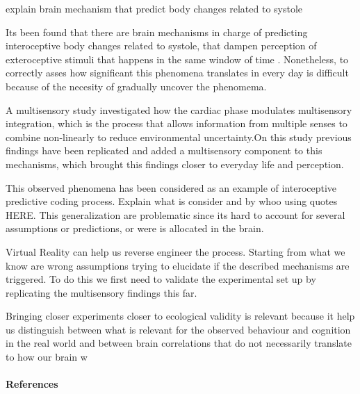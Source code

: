 \documentclass[12pt,oneside,openright]{report}
\begin{document}
explain brain mechanism that predict body changes related to systole

Its been found that there are brain mechanisms in charge of predicting interoceptive body changes related to systole, that dampen perception of exteroceptive stimuli that happens in the same window of time \parencite{SALTAFOSSI2023108642}. Nonetheless, to correctly asses how significant this phenomena translates in every day is difficult because of the necesity of gradually uncover the phenomema. 

A multisensory study investigated how the cardiac phase modulates multisensory integration, which is the process that allows information from multiple senses to combine non-linearly to reduce environmental uncertainty.On this study previous findings have been replicated and added a multisensory component to this mechanisms, which brought this findings closer to everyday life and perception. 

This observed phenomena has been considered as an example of interoceptive predictive coding process. Explain what is consider and by whoo using quotes HERE. This generalization are problematic since its hard to account for several assumptions or predictions, or were is allocated in the brain. 

Virtual Reality can help us reverse engineer the process. Starting from what we know are wrong assumptions trying to elucidate if the described mechanisms are triggered. To do this we first need to validate the experimental set up by replicating the multisensory findings this far.

Bringing closer experiments closer to ecological validity is relevant because it help us distinguish between what is relevant for the observed behaviour and cognition in the real world and between brain correlations that do not necessarily translate to how our brain w 

\pagebreak

\paragraph{\textbf{References}}
\printbibliography[heading=none]
\end{document}
